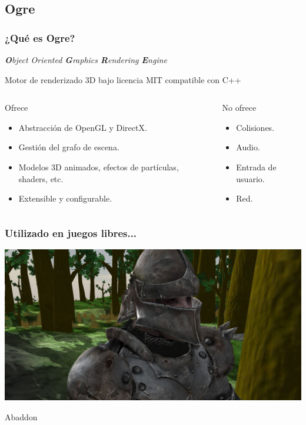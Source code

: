 \documentclass[green]{beamer}
\begin{document}
\subsection{Ogre}
\begin{frame}
\transdissolve
    \frametitle{¿Qué es Ogre?}
    
    \begin{center}
	\emph{\textbf{\huge{O}}bject Oriented \textbf{\huge{G}}raphics \textbf{\huge{R}}endering \textbf{\huge{E}}ngine}
    \end{center}
    
    Motor de renderizado 3D bajo licencia MIT compatible con C++
    
    \scriptsize{
    \begin{columns}[t]
    \column{150pt}
	\begin{block}{Ofrece}
            \begin{itemize}
                \item Abstracción de OpenGL y DirectX.
		\item Gestión del grafo de escena.
                \item Modelos 3D animados, efectos de partículas, shaders, etc.
                \item Extensible y configurable.
            \end{itemize}            
        \end{block}

    \column{150pt}
	\begin{alertblock}{No ofrece}
            \begin{itemize}
                \item Colisiones.
		\item Audio.
                \item Entrada de usuario.
                \item Red.
            \end{itemize}            
        \end{alertblock}
    \end{columns} 
    }
\end{frame}

\begin{frame}
    \frametitle{Utilizado en juegos libres...}
    
    \begin{center}
	\includegraphics[scale=0.18]{img/abaddon.jpg}
	    
	\tiny{Abaddon}
    \end{center}
\end{frame}
\end{document}
